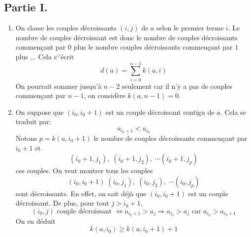 \subsection*{Partie I.}
\begin{enumerate}
  \item On classe les couples décroissants $(i,j)$ de $a$ selon le premier terme $i$. Le nombre de couples décroissant est donc le nombre de couples décroissants commençant par $0$ plus le nombre couples décroissants commençant par $1$ plus ... Cela s`'écrit
\begin{displaymath}
  d(a) = \sum_{i=0}^{n-1}k(a,i)
\end{displaymath}
On pourrait sommer jusqu'à $n-2$ seulement car il n'y a pas de couples commençant par $n-1$, on considère $k(a,n-1)=0$. 

  \item On suppose que $(i_0, i_0 + 1)$ est un couple décroissant contigu de $a$. Cela se traduit par:
  \begin{displaymath}
    a_{i_0 + 1} < a_{i_0}
  \end{displaymath}
Notons $p=k(a,i_0+1)$ le nombre de couples décroissants commençant par $i_0+1$ et 
\begin{displaymath}
  (i_0+1,j_1),\;(i_0+1,j_2),\;\cdots (i_0+1,j_p)
\end{displaymath}
ces couples. On veut montrer tous les couples 
\begin{displaymath}
  (i_0,i_0+1)\; (i_0,j_1),\;(i_0,j_2),\;\cdots (i_0,j_p)
\end{displaymath}
sont décroissants.
En effet, on sait déjà que $(i_0,i_0+1)$ est un couple décroissant. De plus, pour tout $j>i_0+1$,
\begin{displaymath}
  (i_0,j)\text{ couple décroissant }
  \Leftrightarrow a_{i_0+1} > a_j
  \Rightarrow a_{i_0 } > a_j \text{ car } a_{i_0} > a_{i_0+1}
\end{displaymath}
On en déduit
\begin{displaymath}
  k(a,i_0) \geq k(a,i_0+1) + 1
\end{displaymath}


\end{enumerate}
